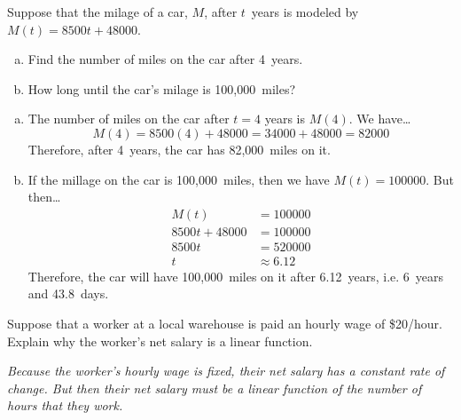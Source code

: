 \documentclass[12pt,letterpaper]{exam}
\begin{document}
\examtitle
{} 
\scores
\newpage

\begin{questions}

\newpage
\question[10] Suppose that the milage of a car, $M$, after $t$~years is modeled by $M(t)= 8500t + 48000$. 
	\begin{enumerate}[(a)]
	\item Find the number of miles on the car after 4~years.
	\item How long until the car's milage is 100,000~miles?
	\end{enumerate} \pspace

{\itshape
\sol 
\begin{enumerate}[(a)]
\item The number of miles on the car after $t= 4$ years is $M(4)$. We have\dots
	\[
	M(4)= 8500(4) + 48000= 34000 + 48000= 82000
	\]
Therefore, after 4~years, the car has 82,000~miles on it. \pspace

\item If the millage on the car is 100,000~miles, then we have $M(t)= 100000$. But then\dots
	\[
	\begin{aligned}
	M(t)&= 100000 \\[0.3cm]
	8500t + 48000&= 100000 \\[0.3cm]
	8500t&= 520000 \\[0.3cm]
	t&\approx 6.12
	\end{aligned}
	\]
Therefore, the car will have 100,000~miles on it after 6.12~years, i.e. 6~years and 43.8~days.  
\end{enumerate}
}



\newpage
\question[10] Suppose that a worker at a local warehouse is paid an hourly wage of \$20/hour. Explain why the worker's net salary is a linear function. \pspace

{\itshape
Because the worker's hourly wage is fixed, their net salary has a constant rate of change. But then their net salary must be a linear function of the number of hours that they work. 
}




\end{questions}
\end{document}
